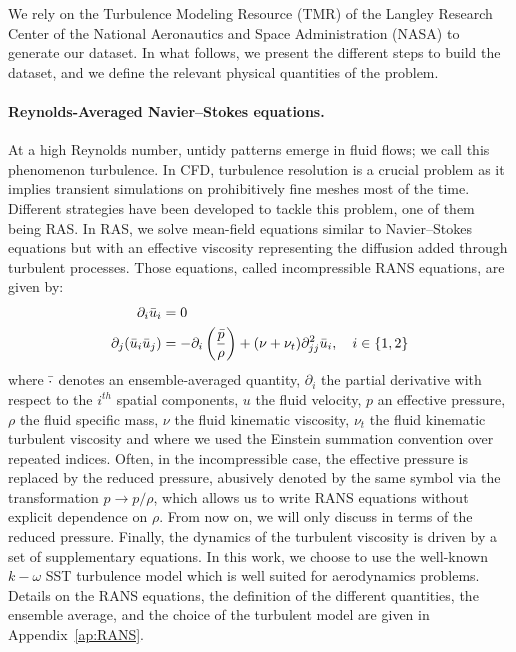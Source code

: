 We rely on the Turbulence Modeling Resource (TMR) of the Langley Research Center of the National Aeronautics and Space Administration (NASA) \cite{TMR, NACA0012-1, NACA0012-2, NACA4412} to generate our dataset. In what follows, we present the different steps to build the dataset, and we define the relevant physical quantities of the problem.

\paragraph{Reynolds-Averaged Navier–Stokes equations.} At a high Reynolds number, untidy patterns emerge in fluid flows; we call this phenomenon turbulence. In CFD, turbulence resolution is a crucial problem as it implies transient simulations on prohibitively fine meshes most of the time. Different strategies have been developed to tackle this problem, one of them being RAS. In RAS, we solve mean-field equations similar to Navier–Stokes equations but with an effective viscosity representing the diffusion added through turbulent processes. Those equations, called incompressible RANS equations, are given by:
\begin{align}
	\partial_i \Bar{u}_i &= 0 \\
	\partial_j(\Bar{u}_i\Bar{u}_j) &= -\partial_i\left(\frac{\Bar{p}}{\rho}\right) + (\nu + \nu_t)\partial^2_{jj}\Bar{u}_i, \quad i\in\{1,2\}
\end{align}
where $\Bar{\cdot}$ denotes an ensemble-averaged quantity, $\partial_i$ the partial derivative with respect to the $i^{th}$ spatial components, $u$ the fluid velocity, $p$ an effective pressure, $\rho$ the fluid specific mass, $\nu$ the fluid kinematic viscosity, $\nu_t$ the fluid kinematic turbulent viscosity and where we used the Einstein summation convention over repeated indices. Often, in the incompressible case, the effective pressure is replaced by the reduced pressure, abusively denoted by the same symbol via the transformation $p \rightarrow p/\rho$, which allows us to write RANS equations without explicit dependence on $\rho$. From now on, we will only discuss in terms of the reduced pressure. Finally, the dynamics of the turbulent viscosity is driven by a set of supplementary equations. In this work, we choose to use the well-known $k-\omega$ SST turbulence model \cite{SST} which is well suited for aerodynamics problems. Details on the RANS equations, the definition of the different quantities, the ensemble average, and the choice of the turbulent model are given in Appendix~\ref{ap:RANS}.

